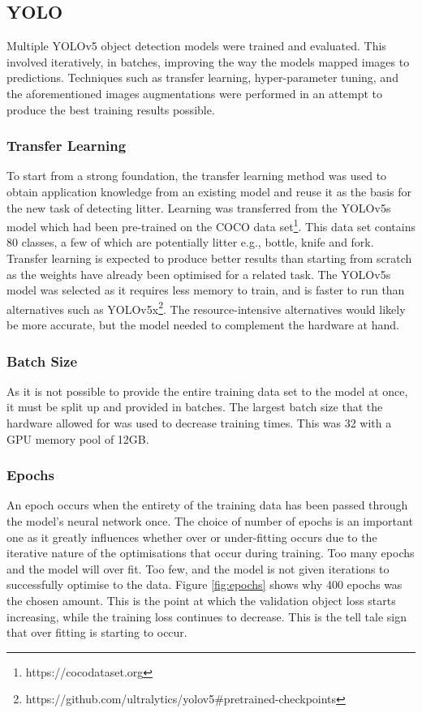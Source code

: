 \documentclass{thesis}
\begin{document}
\subsection{YOLO}

Multiple YOLOv5 object detection models were trained and evaluated. This involved iteratively, in batches, improving the way the models mapped images to predictions. Techniques such as transfer learning, hyper-parameter tuning, and the aforementioned images augmentations were performed in an attempt to produce the best training results possible.

\subsubsection{Transfer Learning}

To start from a strong foundation, the transfer learning method was used to obtain application knowledge from an existing model and reuse it as the basis for the new task of detecting litter. Learning was transferred from the YOLOv5s model which had been pre-trained on the COCO data set\footnote{https://cocodataset.org}. This data set contains 80 classes, a few of which are potentially litter e.g., bottle, knife and fork. Transfer learning is expected to produce better results than starting from scratch as the weights have already been optimised for a related task. The YOLOv5s model was selected as it requires less memory to train, and is faster to run than alternatives such as YOLOv5x\footnote{https://github.com/ultralytics/yolov5\#pretrained-checkpoints}. The resource-intensive alternatives would likely be more accurate, but the model needed to complement the hardware at hand.

\subsubsection{Batch Size} 

As it is not possible to provide the entire training data set to the model at once, it must be split up and provided in batches. The largest batch size that the hardware allowed for was used to decrease training times. This was 32 with a GPU memory pool of 12GB.

\subsubsection{Epochs} 

An epoch occurs when the entirety of the training data has been passed through the model's neural network once. The choice of number of epochs is an important one as it greatly influences whether over or under-fitting occurs due to the iterative nature of the optimisations that occur during training. Too many epochs and the model will over fit. Too few, and the model is not given iterations to successfully optimise to the data. Figure \ref{fig:epochs} shows why 400 epochs was the chosen amount. This is the point at which the validation object loss starts increasing, while the training loss continues to decrease. This is the tell tale sign that over fitting is starting to occur.
\end{document}
